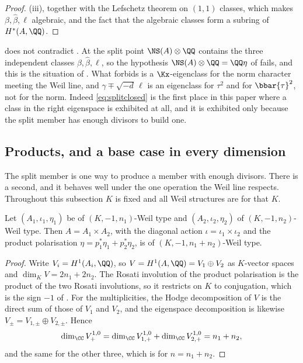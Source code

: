 \begin{proof}
(iii), together with the Lefschetz theorem on $(1,1)$
classes, which makes $\beta,\widehat{\beta},\ell$ algebraic, and the fact that
the algebraic classes form a subring of $H^{*}(A,\QQ)$.
\end{proof}

\begin{remark}\label{rem:splitconsistent}
 does not contradict . At the
split point $\NS(A)\otimes\QQ$ contains the three independent classes
$\beta,\widehat{\beta},\ell$, so the hypothesis
$\NS(A)\otimes\QQ=\QQ\eta$ of  fails, and this is the
situation of . What  forbids is a
$\Kx$-eigenclass for the norm character meeting the Weil line, and
$\gamma\mp\sqrt{-d}\,\ell$ is an eigenclass for $\tau^{2}$ and for
$\bbar{\tau}^{2}$, not for the norm. Indeed \eqref{eq:splitclosed} is the
first place in this paper where a class in the right eigenspace is exhibited
at all, and it is exhibited only because the split member has enough divisors
to build one.
\end{remark}

\subsection{Products, and a base case in every dimension}\label{ssec:products}

The split member is one way to produce a member with enough divisors. There is
a second, and it behaves well under the one operation the Weil line respects.
Throughout this subsection $K$ is fixed and all Weil structures are for that
$K$.

\begin{lemma}\label{lem:prodweil}
Let $(A_{1},\iota_{1},\eta_{1})$ be of $(K,-1,n_{1})$-Weil type and
$(A_{2},\iota_{2},\eta_{2})$ of $(K,-1,n_{2})$-Weil type. Then
$A=A_{1}\times A_{2}$, with the diagonal action
$\iota=\iota_{1}\times\iota_{2}$ and the product polarisation
$\eta=p_{1}^{*}\eta_{1}+p_{2}^{*}\eta_{2}$, is of
$(K,-1,n_{1}+n_{2})$-Weil type.
\end{lemma}

\begin{proof}
Write $V_{i}=H^{1}(A_{i},\QQ)$, so $V=H^{1}(A,\QQ)=V_{1}\oplus V_{2}$ as
$K$-vector spaces and $\dim_{K}V=2n_{1}+2n_{2}$. The Rosati involution of the
product polarisation is the product of the two Rosati involutions, so it
restricts on $K$ to conjugation, which is the sign $-1$ of
. For the multiplicities, the Hodge decomposition of $V$ is
the direct sum of those of $V_{1}$ and $V_{2}$, and the eigenspace
decomposition is likewise $V_{\pm}=V_{1,\pm}\oplus V_{2,\pm}$. Hence
\[
  \dim_{\CC}V_{+}^{1,0}
  =\dim_{\CC}V_{1,+}^{1,0}+\dim_{\CC}V_{2,+}^{1,0}
  =n_{1}+n_{2},
\]
and the same for the other three, which is  for
$n=n_{1}+n_{2}$.
\end{proof}

